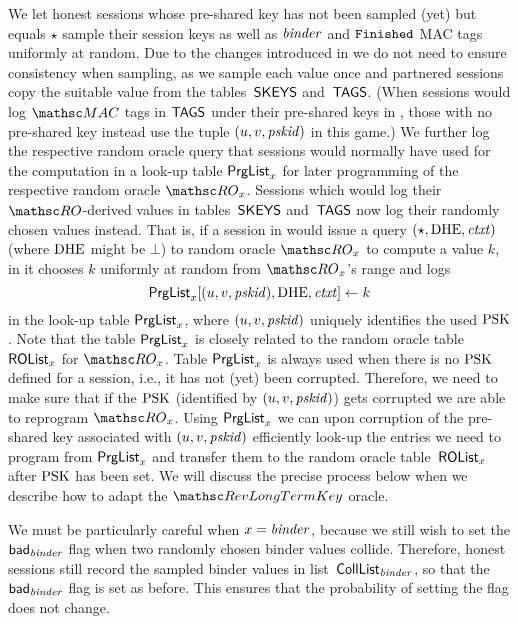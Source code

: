 	We let honest sessions whose pre-shared key has not been sampled (yet) but equals $\star$ sample their session keys as well as $\mathit{binder}$ and $\mathtt{Finished}$ MAC tags uniformly at random.
	Due to the changes introduced in  we do not need to ensure consistency when sampling, as we sample each value once and partnered sessions copy the suitable value from the tables~$\mathsf{SKEYS}$ and~$\mathsf{TAGS}$.
	(When sessions would log $\MAC$ tags in $\mathsf{TAGS}$ under their pre-shared keys in \prevGameText, those with no pre-shared key instead use the tuple $(u, v, \mathit{pskid})$ in this game.)
	We further log the respective random oracle query that sessions would normally have used for the computation in a look-up table $\mathsf{PrgList}_x$ for later programming of the respective random oracle $\RO_x$.
	Sessions which would log their $\RO$-derived values in tables~$\mathsf{SKEYS}$ and~$\mathsf{TAGS}$ now log their randomly chosen values instead. 
	That is, if a session in \prevGameText would issue a query $(\star, \mathrm{DHE}, \mathit{ctxt})$ (where $\mathrm{DHE}$ might be $\bot$) to random oracle $\RO_x$ to compute a value $k$, in \thisGame it chooses $k$ uniformly at random from $\RO_x$'s range and logs 
	\[
		\mathsf{PrgList}_x[ (u,v, \mathit{pskid}) , \mathrm{DHE} , \mathit{ctxt} ] \gets k
	\]
	in the look-up table $\mathsf{PrgList}_x$, where $(u,v, \mathit{pskid})$ uniquely identifies the used $\mathrm{PSK}$.
	Note that the table $\mathsf{PrgList}_x$ is closely related to the random oracle table $\mathsf{ROList}_x$ for $\RO_x$.
	Table $\mathsf{PrgList}_x$ is always used when there is no $\mathrm{PSK}$ defined for a session, i.e., it has not (yet) been corrupted.
	Therefore, we need to make sure that if the $\mathrm{PSK}$ (identified by $(u,v,\mathit{pskid})$) gets corrupted we are able to reprogram $\RO_x$.
	Using $\mathsf{PrgList}_x$ we can upon corruption of the pre-shared key associated with $(u,v,\mathit{pskid})$ efficiently look-up the entries we need to program from $\mathsf{PrgList}_x$ and transfer them to the random oracle table~$\mathsf{ROList}_x$ after $\mathrm{PSK}$ has been set.
	We will discuss the precise process below when we describe how to adapt the $\RevLongTermKey$ oracle.
	
	We must be particularly careful when $x = \mathit{binder}$, because we still wish to set the $\mathsf{bad}_{\mathit{binder}}$ flag when two randomly chosen binder values collide.
	Therefore, honest sessions still record the sampled binder values in list~$\mathsf{CollList}_{\mathit{binder}}$, so that the $\mathsf{bad}_{\mathit{binder}}$ flag is set as before.
	This ensures that the probability of setting the flag does not change.
	
